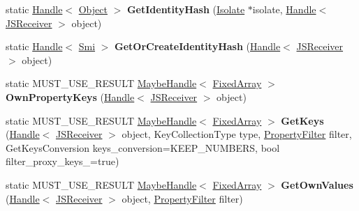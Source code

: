 \begin{DoxyCompactItemize}
\item 
static \hyperlink{classv8_1_1internal_1_1_handle}{Handle}$<$ \hyperlink{classv8_1_1internal_1_1_object}{Object} $>$ {\bfseries Get\+Identity\+Hash} (\hyperlink{classv8_1_1internal_1_1_isolate}{Isolate} $\ast$isolate, \hyperlink{classv8_1_1internal_1_1_handle}{Handle}$<$ \hyperlink{classv8_1_1internal_1_1_j_s_receiver}{J\+S\+Receiver} $>$ object)\hypertarget{classv8_1_1internal_1_1_j_s_receiver_ae325af142046c50e7e201884f0673972}{}\label{classv8_1_1internal_1_1_j_s_receiver_ae325af142046c50e7e201884f0673972}

\item 
static \hyperlink{classv8_1_1internal_1_1_handle}{Handle}$<$ \hyperlink{classv8_1_1internal_1_1_smi}{Smi} $>$ {\bfseries Get\+Or\+Create\+Identity\+Hash} (\hyperlink{classv8_1_1internal_1_1_handle}{Handle}$<$ \hyperlink{classv8_1_1internal_1_1_j_s_receiver}{J\+S\+Receiver} $>$ object)\hypertarget{classv8_1_1internal_1_1_j_s_receiver_aa1153b3cd4c5fd5a4cee82d4093d170f}{}\label{classv8_1_1internal_1_1_j_s_receiver_aa1153b3cd4c5fd5a4cee82d4093d170f}

\item 
static M\+U\+S\+T\+\_\+\+U\+S\+E\+\_\+\+R\+E\+S\+U\+LT \hyperlink{classv8_1_1internal_1_1_maybe_handle}{Maybe\+Handle}$<$ \hyperlink{classv8_1_1internal_1_1_fixed_array}{Fixed\+Array} $>$ {\bfseries Own\+Property\+Keys} (\hyperlink{classv8_1_1internal_1_1_handle}{Handle}$<$ \hyperlink{classv8_1_1internal_1_1_j_s_receiver}{J\+S\+Receiver} $>$ object)\hypertarget{classv8_1_1internal_1_1_j_s_receiver_a19221dc35de02ff9cf162e42b2b581d5}{}\label{classv8_1_1internal_1_1_j_s_receiver_a19221dc35de02ff9cf162e42b2b581d5}

\item 
static M\+U\+S\+T\+\_\+\+U\+S\+E\+\_\+\+R\+E\+S\+U\+LT \hyperlink{classv8_1_1internal_1_1_maybe_handle}{Maybe\+Handle}$<$ \hyperlink{classv8_1_1internal_1_1_fixed_array}{Fixed\+Array} $>$ {\bfseries Get\+Keys} (\hyperlink{classv8_1_1internal_1_1_handle}{Handle}$<$ \hyperlink{classv8_1_1internal_1_1_j_s_receiver}{J\+S\+Receiver} $>$ object, Key\+Collection\+Type type, \hyperlink{namespacev8_afbf02b6b1152a3e25d7bde90798209ac}{Property\+Filter} filter, Get\+Keys\+Conversion keys\+\_\+conversion=K\+E\+E\+P\+\_\+\+N\+U\+M\+B\+E\+RS, bool filter\+\_\+proxy\+\_\+keys\+\_\+=true)\hypertarget{classv8_1_1internal_1_1_j_s_receiver_a78971ac04998c52295fc84d8a9163b2e}{}\label{classv8_1_1internal_1_1_j_s_receiver_a78971ac04998c52295fc84d8a9163b2e}

\item 
static M\+U\+S\+T\+\_\+\+U\+S\+E\+\_\+\+R\+E\+S\+U\+LT \hyperlink{classv8_1_1internal_1_1_maybe_handle}{Maybe\+Handle}$<$ \hyperlink{classv8_1_1internal_1_1_fixed_array}{Fixed\+Array} $>$ {\bfseries Get\+Own\+Values} (\hyperlink{classv8_1_1internal_1_1_handle}{Handle}$<$ \hyperlink{classv8_1_1internal_1_1_j_s_receiver}{J\+S\+Receiver} $>$ object, \hyperlink{namespacev8_afbf02b6b1152a3e25d7bde90798209ac}{Property\+Filter} filter)\hypertarget{classv8_1_1internal_1_1_j_s_receiver_af122fbae42057bea57c27b555b2cc922}{}\label{classv8_1_1internal_1_1_j_s_receiver_af122fbae42057bea57c27b555b2cc922}


\end{DoxyCompactItemize}
